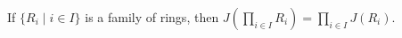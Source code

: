 If $\{R_i \mid i \in I\}$ is a family of rings, then $J\left(\prod_{i \in I} R_i\right) = \prod_{i \in I} J(R_i)$.
